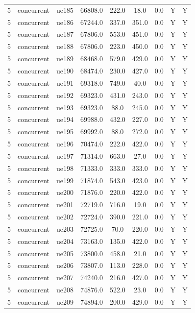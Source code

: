 \begin{table}[ht]
\begin{tabular}{|c|c|c|c|c|c|c|c|c|}
5 & concurrent & ue185 & 66808.0 & 222.0 & 18.0 & 0.0 & Y & Y \\
5 & concurrent & ue186 & 67244.0 & 337.0 & 351.0 & 0.0 & Y & Y \\
5 & concurrent & ue187 & 67806.0 & 553.0 & 451.0 & 0.0 & Y & Y \\
5 & concurrent & ue188 & 67806.0 & 223.0 & 450.0 & 0.0 & Y & Y \\
5 & concurrent & ue189 & 68468.0 & 579.0 & 429.0 & 0.0 & Y & Y \\
5 & concurrent & ue190 & 68474.0 & 230.0 & 427.0 & 0.0 & Y & Y \\
5 & concurrent & ue191 & 69318.0 & 749.0 & 40.0 & 0.0 & Y & Y \\
5 & concurrent & ue192 & 69323.0 & 431.0 & 243.0 & 0.0 & Y & Y \\
5 & concurrent & ue193 & 69323.0 & 88.0 & 245.0 & 0.0 & Y & Y \\
5 & concurrent & ue194 & 69988.0 & 432.0 & 227.0 & 0.0 & Y & Y \\
5 & concurrent & ue195 & 69992.0 & 88.0 & 272.0 & 0.0 & Y & Y \\
5 & concurrent & ue196 & 70474.0 & 222.0 & 422.0 & 0.0 & Y & Y \\
5 & concurrent & ue197 & 71314.0 & 663.0 & 27.0 & 0.0 & Y & Y \\
5 & concurrent & ue198 & 71333.0 & 333.0 & 333.0 & 0.0 & Y & Y \\
5 & concurrent & ue199 & 71874.0 & 543.0 & 423.0 & 0.0 & Y & Y \\
5 & concurrent & ue200 & 71876.0 & 220.0 & 422.0 & 0.0 & Y & Y \\
5 & concurrent & ue201 & 72719.0 & 716.0 & 19.0 & 0.0 & Y & Y \\
5 & concurrent & ue202 & 72724.0 & 390.0 & 221.0 & 0.0 & Y & Y \\
5 & concurrent & ue203 & 72725.0 & 70.0 & 220.0 & 0.0 & Y & Y \\
5 & concurrent & ue204 & 73163.0 & 135.0 & 422.0 & 0.0 & Y & Y \\
5 & concurrent & ue205 & 73800.0 & 458.0 & 21.0 & 0.0 & Y & Y \\
5 & concurrent & ue206 & 73807.0 & 113.0 & 228.0 & 0.0 & Y & Y \\
5 & concurrent & ue207 & 74240.0 & 216.0 & 427.0 & 0.0 & Y & Y \\
5 & concurrent & ue208 & 74876.0 & 522.0 & 23.0 & 0.0 & Y & Y \\
5 & concurrent & ue209 & 74894.0 & 200.0 & 429.0 & 0.0 & Y & Y \\

\end{tabular}
\end{table}

